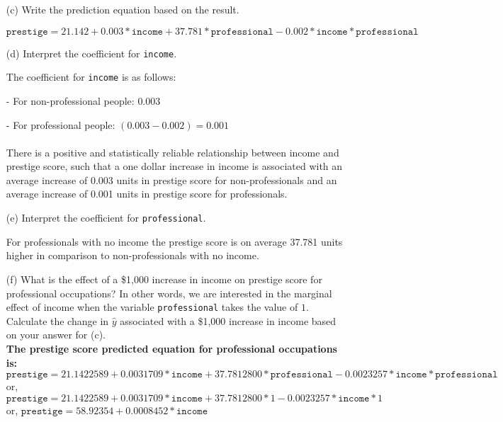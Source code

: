 \documentclass[12pt,letterpaper]{article}
\begin{document}
\begin{enumerate}
	\item [(c)]
	Write the prediction equation based on the result.
	
	\textit{$\texttt{prestige} = 21.142 + 0.003*\texttt{income} + 37.781*\texttt{professional} - 0.002*\texttt{income}*\texttt{professional}$}

\newpage
	\item [(d)]
	Interpret the coefficient for \texttt{income}.
	
	The coefficient for \texttt{income} is as follows:
	\item[-]
	For non-professional people: $0.003$
	\item[-]
	For professional people: $(0.003 - 0.002) = 0.001$
	\\\\
	There is a positive and statistically reliable relationship between income and prestige score, such that a one dollar increase in income is associated with an average increase of 0.003 units in prestige score for non-professionals and an average increase of 0.001 units in prestige score for professionals. 
	
	\vspace*{1cm}
	
	\item [(e)]
	Interpret the coefficient for \texttt{professional}.
	
	For professionals with no income the prestige score is on average 37.781 units higher in comparison to non-professionals with no income.
	
	\vspace*{1cm}
	
	\item [(f)]
	What is the effect of a \$1,000 increase in income on prestige score for professional occupations? In other words, we are interested in the marginal effect of income when the variable \texttt{professional} takes the value of $1$. Calculate the change in $\hat{y}$ associated with a \$1,000 increase in income based on your answer for (c).
	\\
	
	\textbf{The prestige score predicted equation for professional occupations is:}\\
	\textit{$\texttt{prestige} = 21.1422589 + 0.0031709*\texttt{income} + 37.7812800*\texttt{professional} - 0.0023257*\texttt{income}*\texttt{professional}$}\\
	or, \textit{$\texttt{prestige} = 21.1422589 + 0.0031709*\texttt{income} + 37.7812800 * 1 - 0.0023257*\texttt{income} * 1$}\\
	or, \textit{$\texttt{prestige} = 58.92354 + 0.0008452*\texttt{income}$}\\
	

\end{enumerate}
\end{document}
